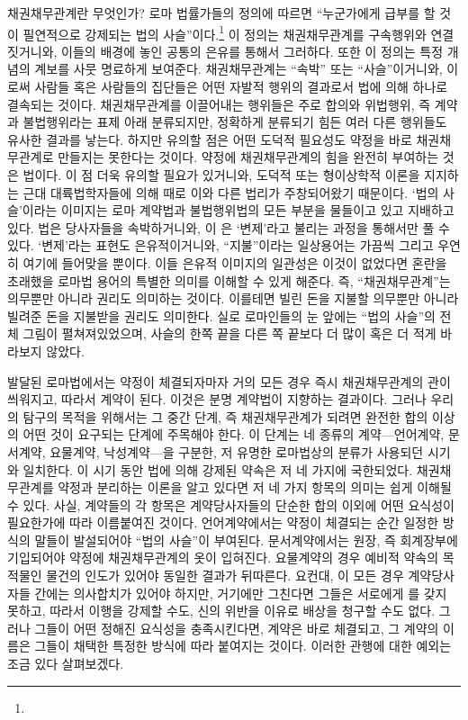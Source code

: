 채권채무관계란 무엇인가?
로마 법률가들의 정의에 따르면
``누군가에게 급부를 할 것이 필연적으로 강제되는
법의 사슬''이다.\footnote{%
   }
이 정의는
채권채무관계를 구속행위와 연결짓거니와,
이들의 배경에 놓인 공통의 은유를 통해서 그러하다.
또한 이 정의는
특정 개념의 계보를 사뭇 명료하게 보여준다.
채권채무관계는 ``속박'' 또는 ``사슬''이거니와,
이로써
사람들 혹은 사람들의 집단들은
어떤 자발적 행위의 결과로서
법에 의해 하나로 결속되는 것이다.
채권채무관계를 이끌어내는 행위들은 주로
합의와 위법행위, 즉
계약과 불법행위라는 표제 아래 분류되지만,
정확하게 분류되기 힘든 여러 다른 행위들도 유사한 결과를 낳는다.
하지만 유의할 점은
어떤 도덕적 필요성도 약정을 바로 채권채무관계로 만들지는 못한다는 것이다.
약정에 채권채무관계의 힘을 완전히 부여하는 것은 법이다.
이 점 더욱 유의할 필요가 있거니와,
도덕적 또는 형이상학적 이론을 지지하는 근대 대륙법학자들에 의해
때로 이와 다른 법리가 주창되어왔기 때문이다.
`법의 사슬'이라는 이미지는
로마 계약법과 불법행위법의 모든 부분을 물들이고 있고 지배하고 있다.
법은 당사자들을 속박하거니와,
이 은 `변제'라고 불리는 과정을
통해서만 풀 수 있다.
`변제'라는 표현도 은유적이거니와,
``지불''이라는 일상용어는 가끔씩 그리고 우연히
여기에 들어맞을 뿐이다.
이들 은유적 이미지의 일관성은
이것이 없었다면 혼란을 초래했을
로마법 용어의 특별한 의미를 이해할 수 있게 해준다.
즉, ``채권채무관계''는 의무뿐만 아니라
권리도 의미하는 것이다.
이를테면 빌린 돈을 지불할 의무뿐만 아니라
빌려준 돈을 지불받을 권리도 의미한다.
실로 로마인들의 눈 앞에는 ``법의 사슬''의 전체 그림이
펼쳐져있었으며,
사슬의 한쪽 끝을 다른 쪽 끝보다 더 많이 혹은 더 적게
바라보지 않았다.

발달된 로마법에서는
약정이 체결되자마자 거의 모든 경우
즉시
채권채무관계의 관이 씌워지고, 따라서 계약이 된다.
이것은 분명 계약법이 지향하는 결과이다.
그러나 우리의 탐구의 목적을 위해서는
그 중간 단계, 즉 채권채무관계가 되려면 완전한 합의 이상의 어떤 것이
요구되는 단계에 주목해야 한다.
이 단계는
네 종류의 계약---언어계약, 문서계약, 요물계약, 낙성계약---을 구분한,
저 유명한 로마법상의 분류가 사용되던 시기와 일치한다.
이 시기 동안 법에 의해 강제된 약속은 저 네 가지에 국한되었다.
채권채무관계를 약정과 분리하는 이론을 알고 있다면
저 네 가지 항목의 의미는
쉽게 이해될 수 있다.
사실,
계약들의 각 항목은
계약당사자들의 단순한 합의 이외에 어떤 요식성이 필요한가에 따라
이름붙여진 것이다.
언어계약에서는 약정이 체결되는 순간
일정한 방식의 말들이 발설되어야 ``법의 사슬''이 부여된다.
문서계약에서는
원장, 즉 회계장부에 기입되어야
약정에 채권채무관계의 옷이 입혀진다.
요물계약의 경우
예비적 약속의 목적물인
물건의 인도가 있어야 동일한 결과가 뒤따른다.
요컨대,
이 모든 경우
계약당사자들 간에는 의사합치가 있어야 하지만,
거기에만 그친다면 그들은 서로에게 를 갖지 못하고,
따라서 이행을 강제할 수도,
신의 위반을 이유로 배상을 청구할 수도 없다.
그러나 그들이 어떤 정해진 요식성을 충족시킨다면,
계약은 바로 체결되고,
그 계약의 이름은 그들이 채택한 특정한 방식에 따라 붙여지는 것이다.
이러한 관행에 대한 예외는 조금 있다 살펴보겠다.

